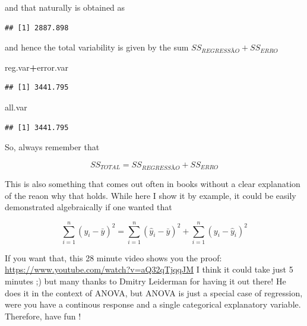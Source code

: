 \documentclass[
]{book}
\newenvironment{Shaded}{\begin{snugshade}}{\end{snugshade}}
\newcommand{\DecValTok}[1]{\textcolor[rgb]{0.00,0.00,0.81}{#1}}
\newcommand{\KeywordTok}[1]{\textcolor[rgb]{0.13,0.29,0.53}{\textbf{#1}}}
\newcommand{\NormalTok}[1]{#1}
\newcommand{\OperatorTok}[1]{\textcolor[rgb]{0.81,0.36,0.00}{\textbf{#1}}}
\begin{document}
and that naturally is obtained as

\begin{Shaded}
\end{Shaded}

\begin{verbatim}
## [1] 2887.898
\end{verbatim}

and hence the total variability is given by the sum \(SS_{REGRESSÃO}+SS_{ERRO}\)

\begin{Shaded}
\begin{Highlighting}[]
\NormalTok{reg.var}\OperatorTok{+}\NormalTok{error.var}
\end{Highlighting}
\end{Shaded}

\begin{verbatim}
## [1] 3441.795
\end{verbatim}

\begin{Shaded}
\begin{Highlighting}[]
\NormalTok{all.var}
\end{Highlighting}
\end{Shaded}

\begin{verbatim}
## [1] 3441.795
\end{verbatim}

So, always remember that

\[SS_{TOTAL}=SS_{REGRESSÃO}+SS_{ERRO}\]

This is also something that comes out often in books without a clear explanation of the reaon why that holds. While here I show it by example, it could be easily demonstrated algebraically if one wanted that

\[\sum_{i=1}^n (y_i- \bar y)^2=\sum_{i=1}^n (\hat y_i- \bar y)^2 + \sum_{i=1}^n (y_i- \hat y_i)^2\]

If you want that, this 28 minute video shows you the proof: \url{https://www.youtube.com/watch?v=aQ32qTjqqJM}
I think it could take just 5 minutes ;) but many thanks to Dmitry Leiderman for having it out there! He does it in the context of ANOVA, but ANOVA is just a special case of regression, were you have a continous response and a single categorical explanatory variable. Therefore, have fun !
\end{document}
